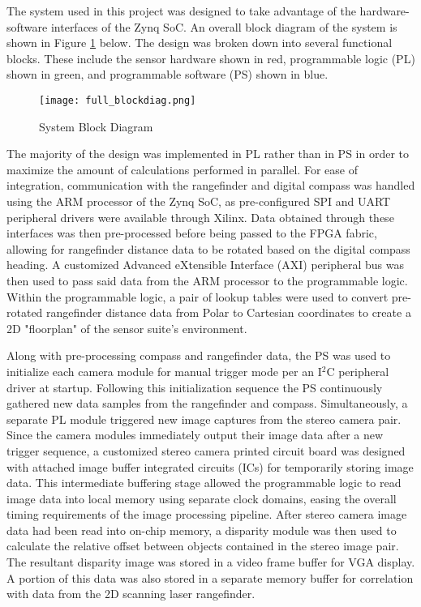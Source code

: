 The system used in this project was designed to take advantage of the hardware-software interfaces of the Zynq SoC. An overall block diagram of the system is shown in Figure \ref{systemBD} below. The design was broken down into several functional blocks. These include the sensor hardware shown in red, programmable logic (PL) shown in green, and programmable software (PS) shown in blue. 

\begin{figure}[H] 
	\centerline{
	\texttt{[image: full\_blockdiag.png]}
	}
	\caption{System Block Diagram}
	\label{systemBD}
\end{figure}

The majority of the design was implemented in PL rather than in PS in order to maximize the amount of calculations performed in parallel. For ease of integration, communication with the rangefinder and digital compass was handled using the ARM processor of the Zynq SoC, as  pre-configured SPI and UART peripheral drivers were available through Xilinx. Data obtained through these interfaces was then pre-processed before being passed to the FPGA fabric, allowing for rangefinder distance data to be rotated based on the digital compass heading. A customized Advanced eXtensible Interface (AXI) peripheral bus was then used to pass said data from the ARM processor to the programmable logic. Within the programmable logic, a pair of lookup tables were used to convert pre-rotated rangefinder distance data from Polar to Cartesian coordinates to create a 2D "floorplan" of the sensor suite's environment.
\par
Along with pre-processing compass and rangefinder data, the PS was used to initialize each camera module for manual trigger mode per an I$^2$C peripheral driver at startup. Following this initialization sequence the PS continuously gathered new data samples from the rangefinder and compass. Simultaneously, a separate PL module triggered new image captures from the stereo camera pair. Since the camera modules immediately output their image data after a new trigger sequence, a customized stereo camera printed circuit board was designed with attached image buffer integrated circuits (ICs) for temporarily storing image data. This intermediate buffering stage allowed the programmable logic to read image data into local memory using separate clock domains, easing the overall timing requirements of the image processing pipeline. After stereo camera image data had been read into on-chip memory, a disparity module was then used to calculate the relative offset between objects contained in the stereo image pair. The resultant disparity image was stored in a video frame buffer for VGA display. A portion of this data was also stored in a separate memory buffer for correlation with data from the 2D scanning laser rangefinder. 
